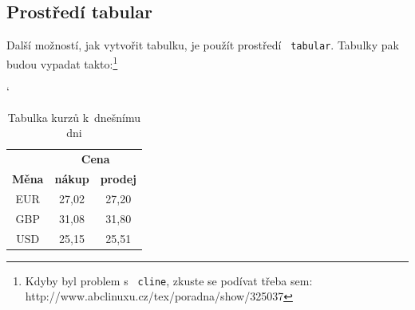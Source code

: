 \documentclass[a4paper, 11pt, ]{article}
\begin{document}
\subsection{Prostředí tabular}
Další možností, jak vytvořit tabulku, je použít prostředí \texttt{ tabular}. Tabulky pak 
budou vypadat takto:\footnote{Kdyby byl problem s \texttt{ cline}, zkuste se podívat třeba sem: 
http://www.abclinuxu.cz/tex/poradna/show/325037}
\begin{table}[ht]
\catcode`
\begin{center}
\begin{tabular}{ | c | c | c | }
\hline
& \multicolumn{2}{|c|}{\textbf{Cena}}\\ 
\cline{2-3}
\textbf{Měna} & \textbf{nákup} & \textbf{prodej}\\ 
\hline
EUR & 27,02 & 27,20\\
GBP & 31,08 & 31,80\\
USD & 25,15 & 25,51\\
\hline
\end{tabular}
\caption{Tabulka kurzů k~dnešnímu dni}
\label{tab1}
\end{center}
\end{table}
\end{document}
